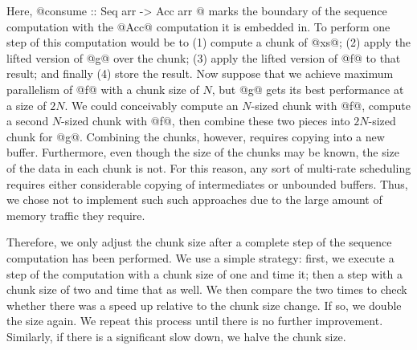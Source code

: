 Here, @consume :: Seq arr -> Acc arr @ marks the boundary of the sequence computation with the @Acc@ computation it is embedded in. To perform one step of this computation would be to (1) compute a chunk of @xs@; (2) apply the lifted version of @g@ over the chunk; (3) apply the lifted version of @f@ to that result; and finally (4) store the result. Now suppose that we achieve maximum parallelism of @f@ with a chunk size of $N$, but @g@ gets its best performance at a size of $2N$. We could conceivably compute an $N$-sized chunk with @f@, compute a second $N$-sized chunk with @f@, then combine these two pieces into $2N$-sized chunk for @g@. Combining the chunks, however, requires copying into a new buffer. Furthermore, even though the size of the chunks may be known, the size of the data in each chunk is not. For this reason, any sort of multi-rate scheduling requires either considerable copying of intermediates or unbounded buffers. Thus, we chose not to implement such such approaches due to the large amount of memory traffic they require.

Therefore, we only adjust the chunk size after a complete step of the sequence computation has been performed. We use a simple strategy: first, we execute a step of the computation with a chunk size of one and time it; then a step with a chunk size of two and time that as well. We then compare the two times to check whether there was a speed up relative to the chunk size change. If so, we double the size again. We repeat this process until there is no further improvement. Similarly, if there is a significant slow down, we halve the chunk size.



